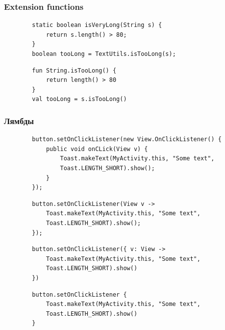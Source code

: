 \documentclass{beamer}
\begin{document}
\begin{frame}[fragile, t]
    \frametitle{Extension functions}
    \begin{verbatim}
        static boolean isVeryLong(String s) {
            return s.length() > 80;
        }
        boolean tooLong = TextUtils.isTooLong(s);
    \end{verbatim}

    \begin{verbatim}
        fun String.isTooLong() {
            return length() > 80
        }
        val tooLong = s.isTooLong()
    \end{verbatim}
\end{frame}

\begin{frame}[fragile, t]
    \frametitle{Лямбды}
    \begin{verbatim}
        button.setOnClickListener(new View.OnClickListener() {
            public void onCLick(View v) {
                Toast.makeText(MyActivity.this, "Some text",
                Toast.LENGTH_SHORT).show();
            }
        });
    \end{verbatim}

    \begin{verbatim}
        button.setOnClickListener(View v ->
            Toast.makeText(MyActivity.this, "Some text",
            Toast.LENGTH_SHORT).show();
        });
    \end{verbatim}

    \begin{verbatim}
        button.setOnClickListener({ v: View ->
            Toast.makeText(MyActivity.this, "Some text",
            Toast.LENGTH_SHORT).show()
        })
    \end{verbatim}

    \begin{verbatim}
        button.setOnClickListener {
            Toast.makeText(MyActivity.this, "Some text",
            Toast.LENGTH_SHORT).show()
        }
    \end{verbatim}
\end{frame}
\end{document}
